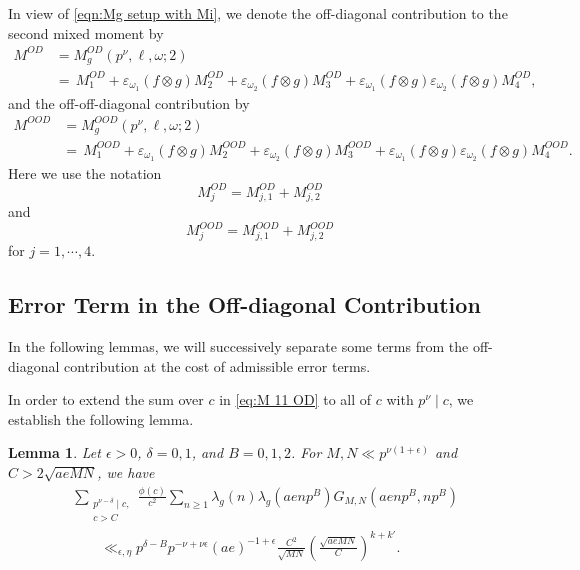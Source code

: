 \documentclass[12pt]{amsart}
\theoremstyle{plain}
\newtheorem{lem}{Lemma}[subsection]
\theoremstyle{definition}
\newcommand{\ve}{\varepsilon}
\begin{document}
  In view of \eqref{eqn:Mg setup with Mi}, we denote the off-diagonal contribution to the second mixed moment by
    \begin{align}\label{eqn:off-diag-contr}
     M^{OD}
    &= M^{OD}_g(p^{\nu}, \ell, \omega; 2)\nonumber
     \\&= \,  M^{OD}_{1}
     +\ve_{\omega_1}(f\otimes g)M^{OD}_{2}+\ve_{\omega_2}(f\otimes g)M^{OD}_{3}
      +\ve_{\omega_1}(f\otimes g)\ve_{\omega_2}(f\otimes g) M^{OD}_{4} ,
    \end{align}
    and the off-off-diagonal contribution by 
    \begin{align}\label{eqn:off-off-diag-contr}
     M^{OOD}
    &= M^{OOD}_g(p^{\nu}, \ell, \omega; 2)\nonumber
     \\&= \,  M^{OOD}_{1}
     +\ve_{\omega_1}(f\otimes g)M^{OOD}_{2}+\ve_{\omega_2}(f\otimes g)M^{OOD}_{3}
      +\ve_{\omega_1}(f\otimes g)\ve_{\omega_2}(f\otimes g) M^{OOD}_{4}.
    \end{align}
Here we use the notation \begin{equation*}\label{eqn:MjOD}M^{OD}_{j}=M^{OD}_{j, 1}+ M^{OD}_{j,2}\end{equation*} and \begin{equation*}\label{eqn:MjOOD}M^{OOD}_{j}=M^{OOD}_{j, 1}+ M^{OOD}_{j,2}\end{equation*} 
 for $j=1,\cdots,4$.
 
 
 
\subsection{Error Term in the Off-diagonal Contribution}



In the following lemmas, we will successively separate some terms from the off-diagonal contribution at the cost of admissible error terms. 

In order to extend the sum over $c$ in  \eqref{eq:M 11 OD} to all of $c$ with $p^\nu\mid c$, we establish the following lemma.


\begin{lem}\label{lem:extend c}
    Let $\epsilon>0$, $\delta=0, 1$, and $B=0, 1, 2$. For $M,N\ll p^{\nu(1+\epsilon)}$ and $C>2\sqrt{aeMN}$, we have
    \begin{align*}
    &\sum_{\substack{p^{\nu-\delta} \mid c, \\ c> C}}
    \frac{\phi(c)}{c^2}
    \sum_{n \geq 1}  \lambda_g(n) \lambda_g(aenp^B)
G_{M,N}(aenp^B, np^B)
\\&\hspace{2em}\ll_{\epsilon,\eta}   p^{\delta-B}p^{-\nu+\nu\epsilon} (ae)^{-1+\epsilon} \frac{C^{2}}{\sqrt{MN}}\left(\frac{\sqrt{aeMN}}{C}\right)^{k+k'}.
    \end{align*}
\end{lem}
\end{document}
